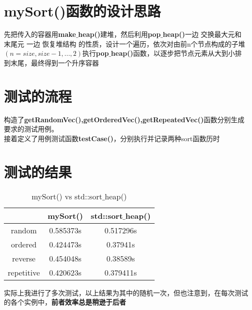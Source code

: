 \documentclass[UTF8]{ctexart}
\begin{document}
\pagestyle{fancy}
\fancyhead{}

\section{mySort()函数的设计思路}
先把传入的容器用\textbf{make$\_$heap()}建堆，然后利用\textbf{pop$\_$heap()}一边 交换最大元和末尾元 一边 恢复堆结构 的性质，设计一个遍历，依次对由前n个节点构成的子堆$(n=size,size-1,...,2)$执行\textbf{pop$\_$heap()}函数，以逐步把节点元素从大到小排到末尾，最终得到一个升序容器

\section{测试的流程}
构造了\textbf{getRandomVec(),getOrderedVec(),getRepeatedVec()}函数分别生成要求的测试用例。\\
接着定义了用例测试函数\textbf{testCase()}，分别执行并记录两种sort函数历时

\section{测试的结果}
\begin{table}[ht]
\centering
\begin{tabular}{|c|c|c|}  %
\hline  %
& mySort()& std::sort$\_$heap()\\  %
\hline
random& 0.585373s& 0.517296s\\  %
\hline
ordered& 0.424473s& 0.37941s\\  %
\hline
 reverse& 0.454048s&0.38589s\\
\hline
 repetitive& 0.420623s&0.379411s\\
\hline
\end{tabular}
\caption{mySort() vs std::sort$\_$heap()}
\end{table}
实际上我进行了多次测试，以上结果为其中的随机一次，但也注意到，在每次测试的各个实例中，\textbf{前者效率总是稍逊于后者}
\end{document}
